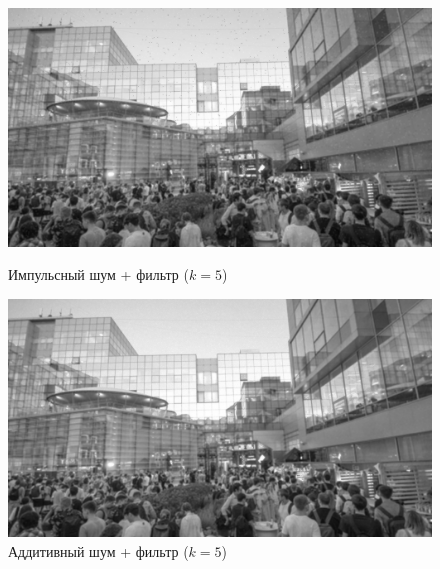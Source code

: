 \documentclass[a4paper]{article}
\begin{document}
\begin{figure}[H]
    \begin{minipage}{0.49\textwidth}
        \centering \includegraphics[width=\textwidth]{images/3_nonlinear_filters/impulse - wiener (k=5).jpg}
        \caption{Импульсный шум + фильтр ($k = 5$)}
    \end{minipage}\hfill
    \begin{minipage}{0.49\textwidth}
        \centering \includegraphics[width=\textwidth]{images/3_nonlinear_filters/additive - wiener (k=5).jpg}
        \caption{Аддитивный шум + фильтр ($k = 5$)}
    \end{minipage}
\end{figure}
\end{document}
